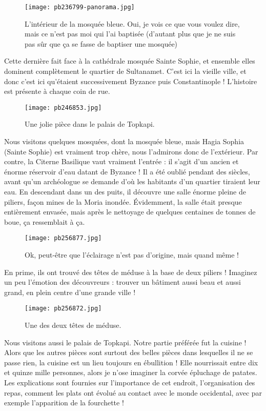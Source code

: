 \documentclass{book}
\begin{document}
\begin{figure}[h]
\centering
\texttt{[image: pb236799-panorama.jpg]}
\caption*{L'intérieur de la mosquée bleue. Oui, je vois ce que vous voulez dire, mais ce n'est pas moi qui l'ai baptisée (d'autant plus que je ne suis pas sûr que ça se fasse de baptiser une mosquée)}
\end{figure}

Cette dernière fait face à la cathédrale mosquée Sainte Sophie, et ensemble elles dominent complètement le quartier de Sultanamet. C'est ici la vieille ville, et donc c'est ici qu'étaient successivement Byzance puis Constantinople ! L'histoire est présente à chaque coin de rue.


\begin{figure}[h]
\centering
\texttt{[image: pb246853.jpg]}
\caption*{Une jolie pièce dans le palais de Topkapi.}
\end{figure}

Nous visitons quelques mosquées, dont la mosquée bleue, mais Hagia Sophia (Sainte Sophie) est vraiment trop chère, nous l'admirons donc de l'extérieur. Par contre, la Citerne Basilique vaut vraiment l'entrée : il s'agit d'un ancien et énorme réservoir d'eau datant de Byzance ! Il a été oublié pendant des siècles, avant qu'un archéologue se demande d'où les habitants d'un quartier tiraient leur eau. En descendant dans un des puits, il découvre une salle énorme pleine de piliers, façon mines de la Moria inondée. Évidemment, la salle était presque entièrement envasée, mais après le nettoyage de quelques centaines de tonnes de boue, ça ressemblait à ça.


\begin{figure}[h]
\centering
\texttt{[image: pb256877.jpg]}
\caption*{Ok, peut-être que l'éclairage n'est pas d'origine, mais quand même !}
\end{figure}

En prime, ils ont trouvé des têtes de méduse à la base de deux piliers ! Imaginez un peu l'émotion des découvreurs : trouver un bâtiment aussi beau et aussi grand, en plein centre d'une grande ville !


\begin{figure}[h]
\centering
\texttt{[image: pb256872.jpg]}
\caption*{Une des deux têtes de méduse.}
\end{figure}

Nous visitons aussi le palais de Topkapi. Notre partie préférée fut la cuisine ! Alors que les autres pièces sont surtout des belles pièces dans lesquelles il ne se passe rien, la cuisine est un lieu toujours en ébullition ! Elle nourrissait entre dix et quinze mille personnes, alors je n'ose imaginer la corvée épluchage de patates. Les explications sont fournies sur l'importance de cet endroit, l'organisation des repas, comment les plats ont évolué au contact avec le monde occidental, avec par exemple l'apparition de la fourchette !
\end{document}
